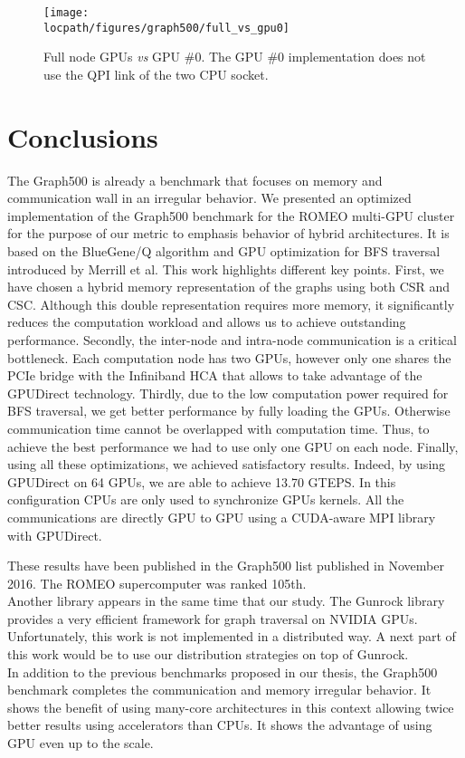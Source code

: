 \begin{figure}[!t]
\centering
\texttt{[image: \\locpath/figures/graph500/full\_vs\_gpu0]}
\caption[Comparison using GPU \#0 and GPU \#0 + \#1]{Full node GPUs \textit{vs} GPU \#0. The GPU \#0 implementation does not use the QPI link of the two CPU socket.}
\label{fig:full_vs_gpu0}
\end{figure}

\section{Conclusions}

The Graph500 is already a benchmark that focuses on memory and communication wall in an irregular behavior.
We presented an optimized implementation of the Graph500 benchmark for the ROMEO  multi-GPU cluster for the purpose of our metric to emphasis behavior of hybrid architectures.
It is based on the BlueGene/Q algorithm and GPU optimization for BFS traversal introduced by Merrill et al. 
This work highlights different key points.
First, we have chosen a hybrid memory representation of the graphs using both CSR and CSC. 
Although this double representation requires more memory, it significantly reduces the computation workload and allows us to achieve outstanding performance.
Secondly, the inter-node and intra-node communication is a critical bottleneck. 
Each computation node has two GPUs, however only one shares the PCIe bridge with the Infiniband HCA that allows to take advantage of the GPUDirect technology.
Thirdly, due to the low computation power required for BFS traversal, we get better performance by fully loading the GPUs.
Otherwise communication time cannot be overlapped with computation time. 
Thus, to achieve the best performance we had to use only one GPU on each node.
Finally, using all these optimizations, we achieved satisfactory results. 
Indeed, by using GPUDirect on 64 GPUs, we are able to achieve 13.70 GTEPS. 
In this configuration CPUs are only used to synchronize GPUs kernels. 
All the communications are directly GPU to GPU using a CUDA-aware MPI library with GPUDirect.

These results have been published in the Graph500 list published in November 2016. 
The ROMEO supercomputer was ranked 105th.\\ 

Another library appears in the same time that our study. 
The Gunrock library\cite{wang2015gunrock} provides a very efficient framework for graph traversal on NVIDIA GPUs. 
Unfortunately, this work is not implemented in a distributed way. 
A next part of this work would be to use our distribution strategies on top of Gunrock.\\

In addition to the previous benchmarks proposed in our thesis, the Graph500  benchmark completes the communication and memory irregular behavior. 
It shows the benefit of using many-core architectures in this context allowing twice better results using accelerators than CPUs.
It shows the advantage of using GPU even up to the scale. 

